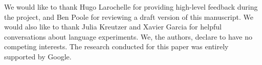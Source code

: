 \begin{ack}
We would like to thank Hugo Larochelle for providing high-level feedback during the project, and Ben Poole for reviewing a draft version of this manuscript. We would also like to thank Julia Kreutzer and Xavier Garcia for helpful conversations about language experiments. We, the authors, declare to have no competing interests. The research conducted for this paper was entirely supported by Google. 
\end{ack}

